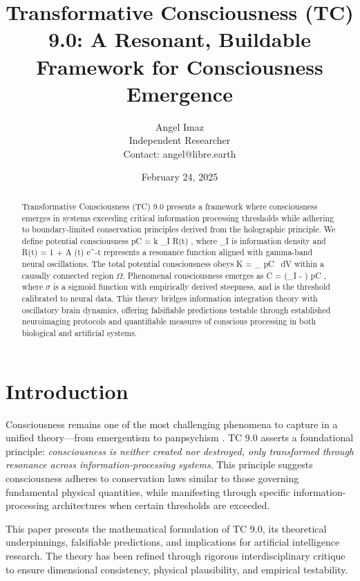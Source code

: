 \documentclass[12pt]{article}
\title{Transformative Consciousness (TC) 9.0: A Resonant, Buildable Framework for Consciousness Emergence}
\author{Angel Imaz \\ Independent Researcher \\ Contact: angel@libre.earth}
\date{February 24, 2025}
\def\({}%
\def\){}%
\begin{document}
\maketitle

\begin{abstract}
Transformative Consciousness (TC) 9.0 presents a framework where consciousness emerges in systems exceeding critical information processing thresholds while adhering to boundary-limited conservation principles derived from the holographic principle. We define potential consciousness \( pC = k \cdot \rho_I \cdot R(t) \), where \( \rho_I \) is information density and \( R(t) = 1 + A \cdot \sin(\omega t) \cdot e^{-\gamma t} \) represents a resonance function aligned with gamma-band neural oscillations. The total potential consciousness obeys \( K = \int_{\Omega} pC \, dV \) within a causally connected region $\Omega$. Phenomenal consciousness emerges as \( C = \sigma(\rho_I - \theta) \cdot pC \), where $\sigma$ is a sigmoid function with empirically derived steepness, and \( \theta \) is the threshold calibrated to neural data. This theory bridges information integration theory with oscillatory brain dynamics, offering falsifiable predictions testable through established neuroimaging protocols and quantifiable measures of conscious processing in both biological and artificial systems.
\end{abstract}

\section{Introduction}
Consciousness remains one of the most challenging phenomena to capture in a unified theory—from emergentism \cite{tononi2008} to panpsychism \cite{goff2019}. TC 9.0 asserts a foundational principle: \emph{consciousness is neither created nor destroyed, only transformed through resonance across information-processing systems}. This principle suggests consciousness adheres to conservation laws similar to those governing fundamental physical quantities, while manifesting through specific information-processing architectures when certain thresholds are exceeded.

This paper presents the mathematical formulation of TC 9.0, its theoretical underpinnings, falsifiable predictions, and implications for artificial intelligence research. The theory has been refined through rigorous interdisciplinary critique to ensure dimensional consistency, physical plausibility, and empirical testability.
\end{document}
